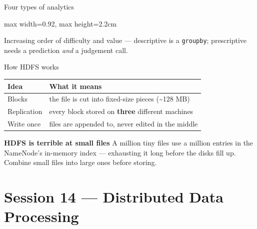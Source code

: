 \documentclass[10pt,aspectratio=169]{beamer}
\newcommand{\trapbox}[2]{%
  \begin{alertblock}{\textbf{#1}}
  #2
  \end{alertblock}%
}
\begin{document}
\begin{frame}{Four types of analytics}
\begin{center}
\begin{adjustbox}{max width=0.92\linewidth, max height=2.2cm}
\end{adjustbox}
\end{center}
\vspace{0.3cm}
Increasing order of difficulty and value --- descriptive is a \texttt{groupby}; prescriptive needs a prediction \emph{and} a judgement call.
\end{frame}

\begin{frame}{How HDFS works}
\begin{table}
\small
\begin{tabularx}{\linewidth}{@{}lX@{}}
\toprule
\textbf{Idea} & \textbf{What it means} \\
\midrule
Blocks & the file is cut into fixed-size pieces (\textasciitilde128 MB) \\
Replication & every block stored on \textbf{three} different machines \\
Write once & files are appended to, never edited in the middle \\
\bottomrule
\end{tabularx}
\end{table}
\trapbox{HDFS is terrible at small files}{A million tiny files use a million entries in the NameNode's in-memory index --- exhausting it long before the disks fill up. Combine small files into large ones before storing.}
\end{frame}

\section{Session 14 --- Distributed Data Processing}
\end{document}

